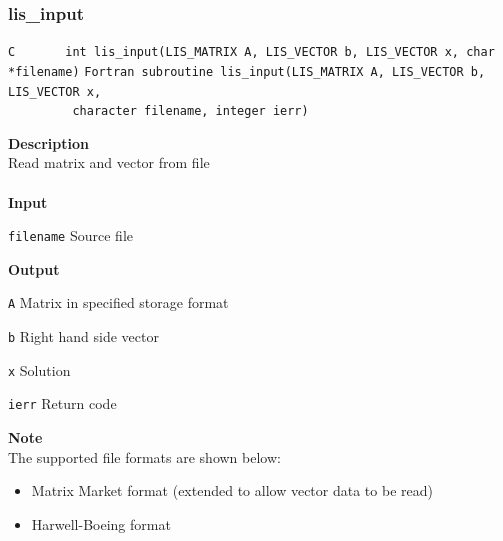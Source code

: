 \documentclass[a4paper]{article}
\newcommand{\namelistlabel}[1]{\mbox{#1}\hfill}
\newenvironment{namelist}[1]{%
 \begin{list}{}
  {\let\makelabel\namelistlabel
  \settowidth{\labelwidth}{#1}
  \setlength{\leftmargin}{1.1\labelwidth}}
}{%
\end{list}}
\begin{document}
  \subsubsection{lis\_input}
\begin{screen}
\verb|C       int lis_input(LIS_MATRIX A, LIS_VECTOR b, LIS_VECTOR x, char *filename)|
\verb|Fortran subroutine lis_input(LIS_MATRIX A, LIS_VECTOR b, LIS_VECTOR x,|\\
\verb|         character filename, integer ierr)|
\end{screen}
{\bf Description}\\
\indent
Read matrix and vector from file
\\ \\
\noindent
{\bf Input}
\begin{namelist}{XXXXXXXXXXXXXXXXXXXX}
\item[\tt filename] Source file
\end{namelist}
{\bf Output}
\begin{namelist}{XXXXXXXXXXXXXXXXXXXX}
\item[\tt A] Matrix in specified storage format
\item[\tt b] Right hand side vector
\item[\tt x] Solution
\item[\tt ierr] Return code
\end{namelist}
{\bf Note}\\
\indent
The supported file formats are shown below:
\begin{itemize}
\item Matrix Market format (extended to allow vector data to be read)
\item Harwell-Boeing format
\end{itemize}

\end{document}
